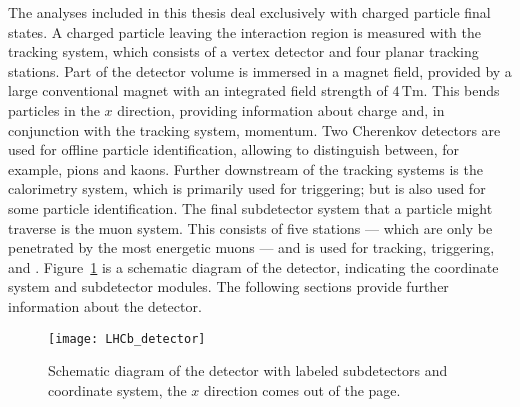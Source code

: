 
The analyses included in this thesis deal exclusively with charged particle final states.
A charged particle leaving the interaction region is measured with the tracking system, which
consists of a vertex detector and four planar tracking stations.
Part of the detector volume is immersed in a magnet field, provided by a large conventional magnet
with an integrated field strength of $4\,\mathrm{Tm}$.
This bends particles in the $x$ direction, providing information about charge and, in conjunction
with the tracking system, momentum.
Two Cherenkov detectors are used for offline particle identification, allowing \lhcb to distinguish
between, for example, pions and kaons.
Further downstream of the tracking systems is the calorimetry system, which is primarily used for
triggering; but is also used for some particle identification.
The final subdetector system that a particle might traverse is the muon system.
This consists of five stations --- which are only be penetrated by the most energetic muons --- and
is used for tracking, triggering, and \pid.
Figure~\ref{fig:lhcb:lhcb} is a schematic diagram of the \lhcb detector, indicating the coordinate
system and subdetector modules.
The following sections provide further information about the \lhcb detector.


\begin{figure}
  \begin{center}
    \texttt{[image: LHCb\_detector]}
  \end{center}
  \caption[Diagram of the LHCb detector]
  {
    Schematic diagram of the \lhcb detector with labeled subdetectors and coordinate system, the
    $x$ direction comes out of the page.
  }
  \label{fig:lhcb:lhcb}
\end{figure}


